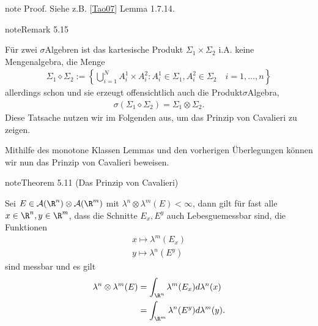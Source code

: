 \documentclass[letterpaper,10pt,german]{jupyterBook}
\begin{document}
\begin{sphinxadmonition}{note}
\sphinxAtStartPar
Proof. Siehe z.B. {[}\hyperlink{cite.references:id6}{Tao07}{]} Lemma 1.7.14.
\end{sphinxadmonition}
\label{masstheorie/integrationstechnik:remark-15}
\begin{sphinxadmonition}{note}{Remark 5.15}



\sphinxAtStartPar
Für zwei \(\sigma\)\sphinxhyphen{}Algebren ist das kartesische Produkt \(\Sigma_1\times\Sigma_2\) i.A. keine Mengenalgebra, die Menge
\begin{equation*}
\begin{split}\Sigma_1\diamond\Sigma_2:= \left\{\bigcup_{i=1}^N A^1_i\times A^2_i: A^1_i\in\Sigma_1, A^2_i\in\Sigma_2\quad i=1,\ldots,n\right\}\end{split}
\end{equation*}
\sphinxAtStartPar
allerdings schon und sie erzeugt offensichtlich auch die Produkt\sphinxhyphen{}\(\sigma\)\sphinxhyphen{}Algebra,
\begin{equation*}
\begin{split}\sigma(\Sigma_1\diamond\Sigma_2) = \Sigma_1\otimes\Sigma_2.\end{split}
\end{equation*}
\sphinxAtStartPar
Diese Tatsache nutzen wir im Folgenden aus, um das Prinzip von Cavalieri zu zeigen.
\end{sphinxadmonition}

\sphinxAtStartPar
Mithilfe des monotone Klassen Lemmas und den vorherigen Überlegungen können wir nun das Prinzip von Cavalieri beweisen.
\label{masstheorie/integrationstechnik:thm:cavalieri}
\begin{sphinxadmonition}{note}{Theorem 5.11 (Das Prinzip von Cavalieri)}



\sphinxAtStartPar
Sei \(E \in \mathcal{A}(\R^n)\otimes\mathcal{A}(\R^m)\) mit \(\lambda^{n}\otimes\lambda^{m}(E) < \infty\),
dann gilt für fast alle \(x\in\R^n,y\in\R^m\), dass die Schnitte \(E_x, E^y\) auch Lebesgue\sphinxhyphen{}messbar sind, die Funktionen
\begin{equation*}
\begin{split}x \mapsto \lambda^m(E_x)\\
y \mapsto \lambda^n(E^y)\end{split}
\end{equation*}
\sphinxAtStartPar
sind messbar und es gilt
\begin{equation*}
\begin{split}\lambda^{n}\otimes\lambda^{m}(E) &= \int_{\R^n} \lambda^m(E_x) d\lambda^n(x)\\
&=
\int_{\R^m} \lambda^n(E^y) d\lambda^m(y).\end{split}
\end{equation*}\end{sphinxadmonition}
\end{document}
